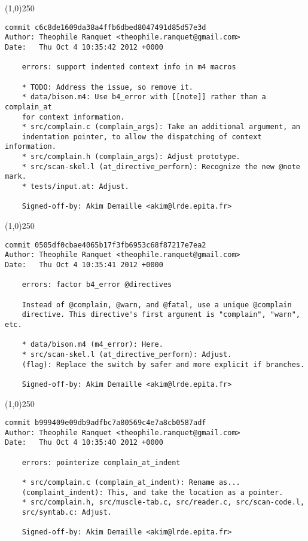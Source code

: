 \line(1,0){250}
\begin{verbatim}
commit c6c8de1609da38a4ffb6dbed8047491d85d57e3d
Author: Theophile Ranquet <theophile.ranquet@gmail.com>
Date:   Thu Oct 4 10:35:42 2012 +0000

    errors: support indented context info in m4 macros
    
    * TODO: Address the issue, so remove it.
    * data/bison.m4: Use b4_error with [[note]] rather than a complain_at
    for context information.
    * src/complain.c (complain_args): Take an additional argument, an
    indentation pointer, to allow the dispatching of context information.
    * src/complain.h (complain_args): Adjust prototype.
    * src/scan-skel.l (at_directive_perform): Recognize the new @note mark.
    * tests/input.at: Adjust.
    
    Signed-off-by: Akim Demaille <akim@lrde.epita.fr>

\end{verbatim}
\line(1,0){250}
\begin{verbatim}
commit 0505df0cbae4065b17f3fb6953c68f87217e7ea2
Author: Theophile Ranquet <theophile.ranquet@gmail.com>
Date:   Thu Oct 4 10:35:41 2012 +0000

    errors: factor b4_error @directives
    
    Instead of @complain, @warn, and @fatal, use a unique @complain
    directive. This directive's first argument is "complain", "warn", etc.
    
    * data/bison.m4 (m4_error): Here.
    * src/scan-skel.l (at_directive_perform): Adjust.
    (flag): Replace the switch by safer and more explicit if branches.
    
    Signed-off-by: Akim Demaille <akim@lrde.epita.fr>

\end{verbatim}
\line(1,0){250}
\begin{verbatim}
commit b999409e09db9adfbc7a80569c4e7a8cb0587adf
Author: Theophile Ranquet <theophile.ranquet@gmail.com>
Date:   Thu Oct 4 10:35:40 2012 +0000

    errors: pointerize complain_at_indent
    
    * src/complain.c (complain_at_indent): Rename as...
    (complaint_indent): This, and take the location as a pointer.
    * src/complain.h, src/muscle-tab.c, src/reader.c, src/scan-code.l,
    src/symtab.c: Adjust.
    
    Signed-off-by: Akim Demaille <akim@lrde.epita.fr>

\end{verbatim}
